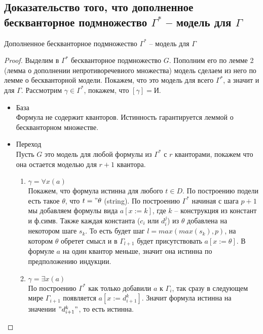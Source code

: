 \subsection{Доказательство того, что дополненное бескванторное подмножество \texorpdfstring{$\Gamma^*$}{Г*} -- модель для \texorpdfstring{$\Gamma$}{Г}}
\label{sec-8-6}
\begin{theorem}
Дополненное бескванторное подмножество $\Gamma^*$ -- модель для $\Gamma$
\end{theorem}
\begin{proof}
Выделим в $\Gamma^*$ бескванторное подмножество $G$. Пополним его по лемме 2 (лемма о дополнении непротиворечевиого множества) модель сделаем из него по лемме о бескванторной модели. Покажем, что это модель для всего $\Gamma^*$, а значит и для $\Gamma$. Рассмотрим $\gamma \in \Gamma^*$, покажем, что $[\gamma] = \texttt{И}$.
\begin{itemize}
\item База\\
Формула не содержит кванторов. Истинность гарантируется леммой о бескванторном множестве.
\item Переход\\
Пусть $G$ это модель для любой формулы из $\Gamma^*$ с $r$ кванторами, покажем что она остается моделью для $r+1$ квантора.
\begin{enumerate}
\item $\gamma = \forall x (a)$\\
Покажем, что формула истинна для любого $t \in D$. По построению подели есть такое $\theta$, что $t = "\theta$ (string). По построению $\Gamma^*$ начиная с шага $p+1$ мы добавляем формулы вида $a[x:=k]$, где $k$ -- конструкция из констант и ф.симв. Также каждая константа ($c_i$ или $d_i^j$) из $\theta$ добавлена на некотором шаге $s_k$. То есть будет шаг $l=max(max(s_k), p)$, на котором $\theta$ обретет смысл и в $\Gamma_{l+1}$ будет присутствовать $a[x:=\theta]$. В формуле $a$ на один квантор меньше, значит она истинна по предположению индукции.
\item $\gamma = \exists x (a)$\\
По построению $\Gamma^*$ как только добавили $a$ к $\Gamma_i$, так сразу в следующем мире $\Gamma_{i+1}$ появляется $a[x:=d_{i+1}^k]$. Значит формула истинна на значении $"d_{i+1}^k"$, то есть истинна.
\end{enumerate}
\end{itemize}
\end{proof}
